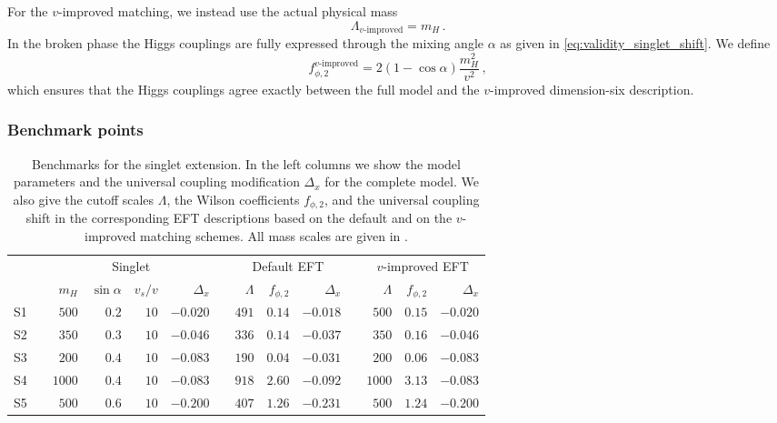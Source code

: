 For the $v$-improved matching, we instead use the actual physical mass
%
\begin{equation}
    \Lambda_{\text{$v$-improved}} = m_H \,.
\end{equation}
%
In the broken phase the Higgs couplings are fully expressed through
the mixing angle $\alpha$ as given in
\autoref{eq:validity_singlet_shift}. We define
%
\begin{equation}
  f_{\phi,2}^{\text{$v$-improved}} = 2 ( 1 - \cos \alpha) \frac {m_H^2} {v^2} \,,
\end{equation} 
%
which ensures that the Higgs couplings agree exactly between the full
model and the $v$-improved dimension-six description.



\subsubsection{Benchmark points}

\begin{table}[t]
  \begin{tabular}{c c rrrr c rrr c rrr}
    \toprule
    \multirow{2}{*}{} && \multicolumn{4}{c}{Singlet} &&
    \multicolumn{3}{c}{Default EFT} && \multicolumn{3}{c}{$v$-improved EFT} \\
    \cmidrule{3-6} \cmidrule{8-10} \cmidrule{12-14}
    && $m_H$ & $\sin\alpha$ & $v_s/v$ & $\Delta_x$ &&
    $\Lambda$ & ${f}_{\phi,2}$ & $\Delta_x$ &&
    $\Lambda$ & ${f}_{\phi,2}$ & $\Delta_x$ \\
    \midrule
    S1 && $500$ & $0.2$ & $10$ & $-0.020$ && $491$ & $0.14$ & $-0.018$ && $500$ & $0.15$ & $-0.020$ \\
    S2 && $350$ & $0.3$ & $10$ & $-0.046$ && $336$ & $0.14$ &  $-0.037$ && $350$ & $0.16$ & $-0.046$ \\
    S3 && $200$ & $0.4$ & $10$ & $-0.083$ && $190$ & $0.04$ & $-0.031$ && $200$ & $0.06$ & $-0.083$ \\
    S4 && $1000$ & $0.4$ & $10$ & $-0.083$ && $918$ & $2.60$ & $-0.092$ && $1000$ & $3.13$ & $-0.083$ \\
    S5 && $500$ &  $0.6$ & $10$ & $-0.200$ && $407$ &$1.26$ & $-0.231$ && $500$ &  $1.24$ & $-0.200$ \\
    \bottomrule
    \end{tabular}
    \caption[Benchmarks for the singlet extension]{Benchmarks for the
      singlet extension. In the left columns we show the model parameters
      and the universal coupling modification $\Delta_x$ for the complete
      model. We also give the cutoff scales $\Lambda$, the Wilson
      coefficients $f_{\phi,2}$, and the universal coupling shift in the corresponding
      EFT descriptions based on the default and on the $v$-improved
      matching schemes. All mass scales are given in \gev.}
  \label{tbl:validity_singlet_benchmarks}
\end{table}

